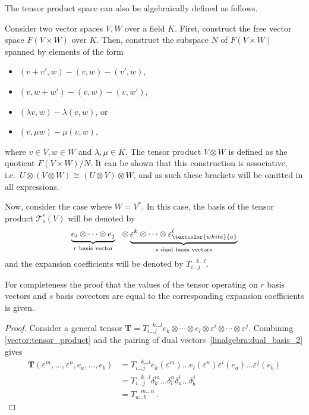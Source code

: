     The tensor product space can also be algebraically defined as follows.
    \begin{adefinition}
        Consider two vector spaces $V,W$ over a field $K$. First, construct the free vector space $F(V\times W)$ over $K$. Then, construct the subspace $N$ of $F(V\times W)$ spanned by elements of the form
        \begin{itemize}
            \item $(v+v',w) - (v,w) - (v',w)$,
            \item $(v,w+w') - (v,w) - (v,w')$,
            \item $(\lambda v,w) - \lambda(v,w)$, or
            \item $(v,\mu w) - \mu(v,w)$,
        \end{itemize}
        where $v\in V,w\in W$ and $\lambda,\mu\in K$. The tensor product $V\otimes W$ is defined as the quotient $F(V\times W)/N$. It can be shown that this construction is associative, i.e.~$U\otimes(V\otimes W)\cong(U\otimes V)\otimes W$, and as such these brackets will be omitted in all expressions.

        Now, consider the case where $W=V^*$. In this case, the basis of the tensor product $\mathcal{T}^r_s(V)$ will be denoted by
        \[\underbrace{e_i\otimes\cdots\otimes e_j}_{r\text{ basis vector}}\ \ \otimes\underbrace{\varepsilon^k\otimes\cdots\otimes \varepsilon^l_{\textcolor{white}{a}}}_{s\text{ dual basis vectors}}\]
        and the expansion coefficients will be denoted by $T_{i\ldots j}^{\ \ \ \ k\ldots l}$.
    \end{adefinition}


    For completeness the proof that the values of the tensor operating on $r$ basis vectors and $s$ basis covectors are equal to the corresponding expansion coefficients is given.
    \begin{mdframed}[roundcorner=10pt, linecolor=blue, linewidth=1pt]
        \begin{proof}
            Consider a general tensor $\mathbf{T} = T_{i\ldots j}^{\ \ \ \ k\ldots l}e_k\otimes\cdots\otimes e_l\otimes\varepsilon^i\otimes\cdots\otimes\varepsilon^j$. Combining \cref{vector:tensor_product} and the pairing of dual vectors~\eqref{linalgebra:dual_basis_2} gives
            \begin{align*}
                \mathbf{T}(\varepsilon^m,\ldots,\varepsilon^n,e_a,\ldots,e_b) &= T_{i\ldots j}^{\ \ \ \ k\ldots l}e_k(\varepsilon^m)\ldots e_l(\varepsilon^n)\varepsilon^i(e_a)\ldots\varepsilon^j(e_b)\\
                &= T_{i\ldots j}^{\ \ \ \ k\ldots l}\delta_k^m\ldots\delta_l^n\delta_a^i\ldots\delta_b^j\\
                &= T_{a\ldots b}^{\ \ \ \ m\ldots n}\,.
            \end{align*}$ $
        \end{proof}
    \end{mdframed}

